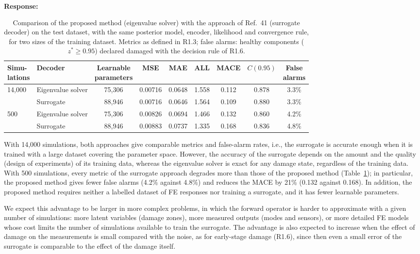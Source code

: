 \documentclass[11pt]{article}
\newenvironment{response}{\par\smallskip\noindent\color{resp}\textbf{Response:}\ }{\par}
\begin{document}
\begin{response}
	\begin{table}[H]
		\centering\small
		\caption{Comparison of the proposed method (eigenvalue solver) with the approach of Ref.~41 (surrogate decoder) on the
			test dataset, with the same posterior model, encoder, likelihood and convergence rule, for two sizes of the
			training dataset. Metrics as defined in R1.3; false alarms: healthy components ($z^*\ge0.95$) declared damaged with the decision rule of R1.6.}
		\label{tab:surrogate}
		\footnotesize
		\setlength{\tabcolsep}{4pt}
		\begin{tabular}{llccccccc}
			\toprule
			\shortstack{Simu-\\lations} & Decoder & \shortstack{Learnable\\parameters} & MSE & MAE & ALL & MACE & $C(0.95)$ & \shortstack{False\\alarms} \\
			\midrule
			14,000 & Eigenvalue solver & 75,306 & 0.00716 & 0.0648 & 1.558 & 0.112 & 0.878 & 3.3\% \\
				   & Surrogate         & 88,946 & 0.00716 & 0.0646 & 1.564 & 0.109 & 0.880 & 3.3\% \\
			\midrule
			500    & Eigenvalue solver & 75,306 & 0.00826 & 0.0694 & 1.466 & 0.132 & 0.860 & 4.2\% \\
				   & Surrogate         & 88,946 & 0.00883 & 0.0737 & 1.335 & 0.168 & 0.836 & 4.8\% \\
			\bottomrule
		\end{tabular}
	\end{table}

	With 14,000 simulations, both approaches give comparable metrics and false-alarm rates, i.e., the surrogate is accurate enough when it is trained with a large dataset covering the parameter space. However, the accuracy of the surrogate depends on the amount and the quality (design of experiments) of its training data, whereas the eigenvalue solver is exact for any damage state, regardless of the training data. With 500 simulations, every metric of the surrogate approach degrades more than those of the proposed method (Table~\ref{tab:surrogate}); in particular, the proposed method gives fewer false alarms (4.2\% against 4.8\%) and reduces the MACE by 21\% (0.132 against 0.168). In addition, the proposed method requires neither a labelled dataset of FE responses nor training a surrogate, and it has fewer learnable parameters.

	We expect this advantage to be larger in more complex problems, in which the forward operator is harder to approximate with a given number of simulations: more latent variables (damage zones), more measured outputs (modes and sensors), or more detailed FE models whose cost limits the number of simulations available to train the surrogate. The advantage is also expected to increase when the effect of damage on the measurements is small compared with the noise, as for early-stage damage (R1.6), since then even a small error of the surrogate is comparable to the effect of the damage itself.



\end{response}
\end{document}
